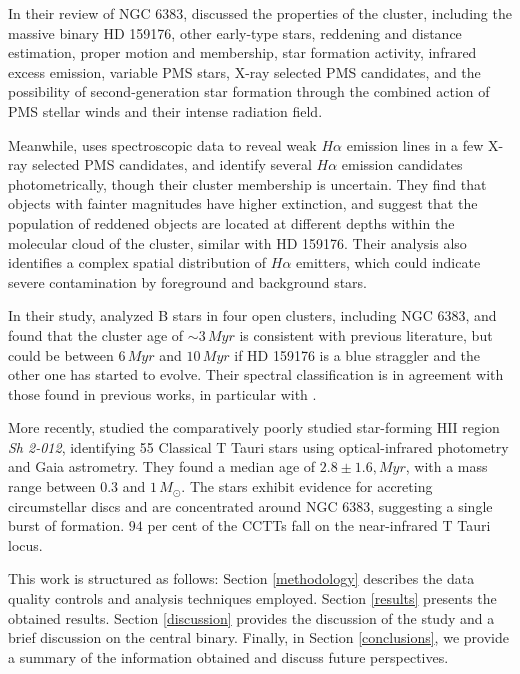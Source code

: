 \documentclass[fleqn,usenatbib,usedcolumn,useAMS]{mnras}
\begin{document}
In their review of NGC 6383, \citet{2008hsf2.book..497R} discussed the properties of the cluster, including the massive binary HD 159176, other early-type stars, reddening and distance estimation, proper motion and membership, star formation activity, infrared excess emission, variable PMS stars, X-ray selected PMS candidates, and the possibility of second-generation star formation through the combined action of PMS stellar winds and their intense radiation field.

Meanwhile, \citet{2010A&A...511A..25R} uses spectroscopic data to reveal weak $H\alpha$ emission lines in a few X-ray selected PMS candidates, and identify several $H\alpha$ emission candidates photometrically, though their cluster membership is uncertain. They find that objects with fainter magnitudes have higher extinction, and suggest that the population of reddened objects are located at different depths within the molecular cloud of the cluster, similar with HD 159176. Their analysis also identifies a complex spatial distribution of $H\alpha$ emitters, which could indicate severe contamination by foreground and background stars.

In their study, \citet{2018A&A...610A..30A} analyzed B stars in four open clusters, including NGC 6383, and found that the cluster age of $\sim 3\,Myr$ is consistent with previous literature, but could be between $6\,Myr$ and $10\,Myr$ if HD 159176 is a blue straggler and the other one has started to evolve. Their spectral classification is in agreement with those found in previous works, in particular with \citet{1978MNRAS.184..661L}.

More recently, \citet{2019MNRAS.484.5102K} studied the comparatively poorly studied star-forming HII region \textit{Sh 2-012}, identifying 55 Classical T Tauri stars using optical-infrared photometry and Gaia astrometry. They found a median age of $2.8 \pm 1.6,Myr$, with a mass range between $0.3$ and $1\,M_\odot$. The stars exhibit evidence for accreting circumstellar discs and are concentrated around NGC 6383, suggesting a single burst of formation. $94$ per cent of the CCTTs fall on the near-infrared T Tauri locus.

This work is structured as follows: Section \ref{methodology} describes the data quality controls and analysis techniques employed. Section \ref{results} presents the obtained results. Section \ref{discussion} provides the discussion of the study and a brief discussion on the central binary. Finally, in Section \ref{conclusions}, we provide a summary of the information obtained and discuss future perspectives.
\end{document}
